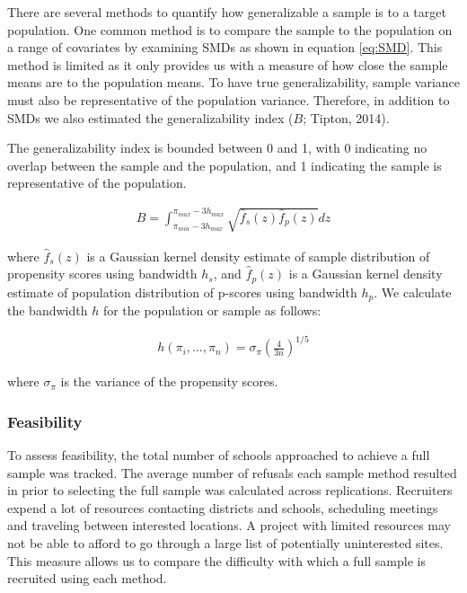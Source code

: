 \documentclass[man,floatsintext]{apa6}
\begin{document}
There are several methods to quantify how generalizable a sample is to a target population. One common method is to compare the sample to the population on a range of covariates by examining SMDs as shown in equation \eqref{eq:SMD}. This method is limited as it only provides us with a measure of how close the sample means are to the population means. To have true generalizability, sample variance must also be representative of the population variance. Therefore, in addition to SMDs we also estimated the generalizability index (\(B\); Tipton, 2014).

The generalizability index is bounded between 0 and 1, with 0 indicating no overlap between the sample and the population, and 1 indicating the sample is representative of the population.

\begin{align}
B = \int_{\pi_{min}-3h_{max}}^{\pi_{max}-3h_{max}}\sqrt{\hat{f}_s(z)\hat{f}_p(z)}dz
\end{align}

where \(\hat{f}_s(z)\) is a Gaussian kernel density estimate of sample distribution of propensity scores using bandwidth \(h_s\), and \(\hat{f}_p(z)\) is a Gaussian kernel density estimate of population distribution of p-scores using bandwidth \(h_p\). We calculate the bandwidth \(h\) for the population or sample as follows:

\begin{align}
h(\pi_i,...,\pi_n) = \sigma_{\pi}(\frac{4}{3n})^{1/5}
\end{align}

where \(\sigma_{\pi}\) is the variance of the propensity scores. 

\hypertarget{feasibility}{%
\subsubsection{Feasibility}\label{feasibility}}

To assess feasibility, the total number of schools approached to achieve a full sample was tracked. The average number of refusals each sample method resulted in prior to selecting the full sample was calculated across replications. Recruiters expend a lot of resources contacting districts and schools, scheduling meetings and traveling between interested locations. A project with limited resources may not be able to afford to go through a large list of potentially uninterested sites. This measure allows us to compare the difficulty with which a full sample is recruited using each method.
\end{document}

